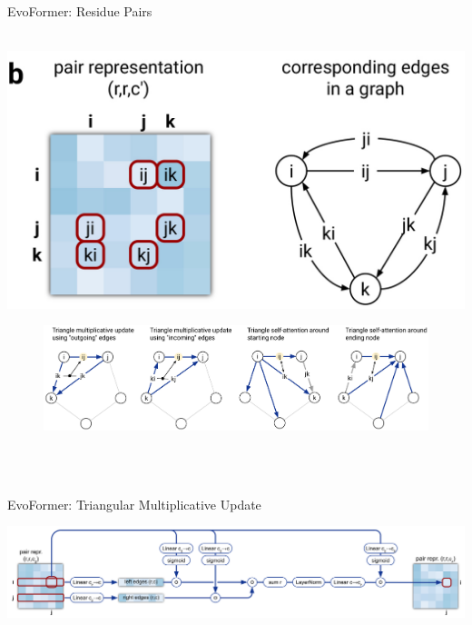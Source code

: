 \documentclass[presentation, smaller]{beamer}
\begin{document}
\begin{frame}[label={sec:org4cba8c0}]{EvoFormer: Residue Pairs}
\begin{center}~\includegraphics[height=0.4\textheight]{./imgs/model-evoformer-pair1.png}
\end{center}
\begin{center}
  \begin{figure}
    \includegraphics[height=0.4\textheight]{./imgs/model-evoformer-pair2.png}
    \caption{~\cite{jumperHighlyAccurateProtein2021}}
    \label{fig:evopair2}
  \end{figure}
\end{center}~\cite{jumperHighlyAccurateProtein2021}
\end{frame}

\begin{frame}[label={sec:orgd80c696}]{EvoFormer: Triangular Multiplicative Update}
\begin{center}
\includegraphics[width=.9\linewidth]{./imgs/triangular-mult-update.png}
\end{center}~\cite{jumperHighlyAccurateProtein2021}
\end{frame}
\end{document}
